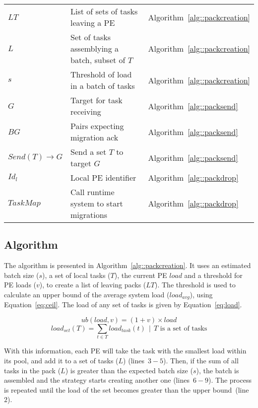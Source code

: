 \begin{table}[t]
{\begin{tabular}{l l l}
		$LT$				& List of sets of tasks leaving a PE					& Algorithm~\ref{alg::packcreation} \\
		$L$				& Set of tasks assemblying a batch, subset of $T$ 	& Algorithm~\ref{alg::packcreation} \\
		$s$			  	& Threshold of load in a batch of tasks 				& Algorithm~\ref{alg::packcreation} \\
		$G$				& Target for task receiving							& Algorithm~\ref{alg::packsend} \\
		$BG$				& Pairs expecting migration ack						& Algorithm~\ref{alg::packsend} \\ 
		$Send(T)\rightarrow G $ & Send a set $T$ to target $G$				& Algorithm~\ref{alg::packsend} \\ 
		$Id_l$ 			& Local PE identifier								& Algorithm~\ref{alg::packdrop} \\
		$TaskMap$		& Call runtime system to start migrations			& Algorithm~\ref{alg::packdrop} \\
		\bottomrule
	\end{tabular}
	}
	\label{tab:algo:symbols}
	\vspace{-10pt}
\end{table}

\subsection{\batchassembly Algorithm} \label{sec:algo:creation}

The \batchassembly algorithm is presented in Algorithm~\ref{alg::packcreation}.
It uses an estimated batch size ($s$), a set of local tasks ($T$), the current PE $load$ and a threshold for PE loads ($v$), to create a list of leaving packs ($LT$).
The threshold is used to calculate an upper bound of the average system load ($load_{avg}$), using Equation~\ref{eq:ceil}. 
The load of any set of tasks is given by Equation~\ref{eq:load}.

\begin{equation}
	ub(load,v) = (1+v)\times load
    \label{eq:ceil}
\end{equation}
\begin{equation}
	load_{set}(T) = \sum_{t \in T}{load_{task}(t)}\ \ |\ \ T \text{ is a set of tasks}
	\label{eq:load}
\end{equation}

With this information, each PE will take the task with the smallest load within its pool, and add it to a set of tasks ($L$) (lines~$3-5$).
Then, if the sum of all tasks in the pack ($L$) is greater than the expected batch size ($s$), the batch is assembled and the strategy starts creating another one (lines~$6-9$).
The process is repeated until the load of the set becomes greater than the upper bound~(line~$2$).

